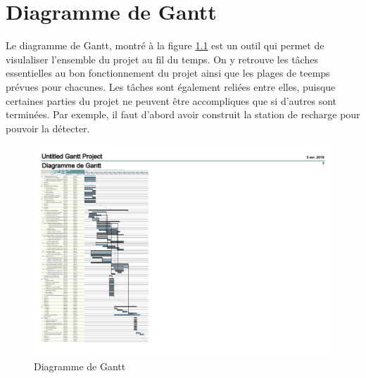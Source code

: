 \chapter{Diagramme de Gantt}

Le diagramme de Gantt, montré à la figure \ref{fig:Gantt} est un outil qui permet de visulaliser l'ensemble du projet au fil du temps. On y retrouve les tâches essentielles au bon fonctionnement du projet ainsi que les plages de teemps prévues pour chacunes. Les tâches sont également reliées entre elles, puisque certaines parties du projet ne peuvent être accompliques que si d'autres sont terminées. Par exemple, il faut d'abord avoir construit la station de recharge pour pouvoir la détecter.

\begin{figure}[ht]
    \centering
    \includegraphics[scale=1, trim = 0 0 16cm 2.5cm, clip]{resources/gantt.pdf}
    \caption{Diagramme de Gantt}
    \label{fig:Gantt}
  \end{figure}